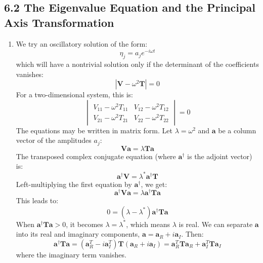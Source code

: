 \documentclass[12pt]{article}
\begin{document}
	\subsection*{6.2 The Eigenvalue Equation and the Principal Axis Transformation}
	\begin{enumerate}
		\item We try an oscillatory solution of the form:
		\[
		\eta_j = a_j e^{-i\omega t}
		\]
		which will have a nontrivial solution only if the determinant of the coefficients vanishes:
		\[
		| \mathbf{V} - \omega^2 \mathbf{T} | = 0
		\]
		For a two-dimensional system, this is:
		\[
		\begin{vmatrix}
			V_{11} - \omega^2 T_{11} & V_{12} - \omega^2 T_{12} \\
			V_{21} - \omega^2 T_{21} & V_{22} - \omega^2 T_{22}
		\end{vmatrix} = 0
		\]
		The equations may be written in matrix form. Let $\lambda = \omega^2$ and $\mathbf{a}$ be a column vector of the amplitudes $a_j$:
		\[
		\mathbf{V}\mathbf{a} = \lambda \mathbf{T}\mathbf{a}
		\]
		The transposed complex conjugate equation (where $\mathbf{a}^\dagger$ is the adjoint vector) is:
		\[
		\mathbf{a}^\dagger \mathbf{V} = \lambda^* \mathbf{a}^\dagger \mathbf{T}
		\]
		Left-multiplying the first equation by $\mathbf{a}^\dagger$, we get:
		\[
		\mathbf{a}^\dagger \mathbf{V} \mathbf{a} = \lambda \mathbf{a}^\dagger \mathbf{T} \mathbf{a}
		\]
		This leads to:
		\[
		0 = (\lambda - \lambda^*) \mathbf{a}^\dagger \mathbf{T} \mathbf{a}
		\]
		When $\mathbf{a}^\dagger \mathbf{T} \mathbf{a} > 0$, it becomes $\lambda = \lambda^*$, which means $\lambda$ is real. We can separate $\mathbf{a}$ into its real and imaginary components, $\mathbf{a} = \mathbf{a}_R + i\mathbf{a}_I$. Then:
		\[
		\mathbf{a}^\dagger \mathbf{T} \mathbf{a} = (\mathbf{a}_R^T - i\mathbf{a}_I^T) \mathbf{T} (\mathbf{a}_R + i\mathbf{a}_I) = \mathbf{a}_R^T \mathbf{T} \mathbf{a}_R + \mathbf{a}_I^T \mathbf{T} \mathbf{a}_I
		\]
		where the imaginary term vanishes.
		

\end{enumerate}
\end{document}

